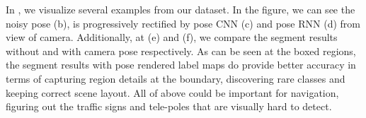 In , we visualize several examples from our dataset. In the figure, we can see the noisy pose (b), is progressively rectified by pose CNN (c) and pose RNN (d) from view of camera. Additionally, at (e) and (f), we compare the segment results without and with camera pose respectively. As can be seen at the boxed regions, the segment results with pose rendered label maps do provide better accuracy in terms of capturing region details at the boundary, discovering rare classes and keeping correct scene layout. All of above could be important for navigation, \eg figuring out the traffic signs and tele-poles that are visually hard to detect.
